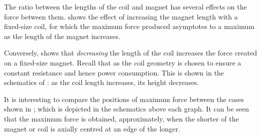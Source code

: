 The ratio between the lengths of the coil and magnet has several
effects on the force between them.  shows the
effect of increasing the magnet length with a fixed-size coil, for
which the maximum force produced asymptotes to a maximum as the
length of the magnet increases.

\begin{figure}
  \begin{subfigure}
  \end{subfigure}\par
  \begin{subfigure}
    \small{}
  \end{subfigure}
\end{figure}

Conversely,  shows that \emph{decreasing} the
length of the coil increases the force created on a fixed-size
magnet. Recall that as the coil geometry is chosen to ensure a constant
resistance and hence power consumption. This is shown in the schematics of
: as the coil length increases, its height decreases.

It is interesting to compare the positions of maximum force
between the cases shown in ;
which is depicted in the schematics above each graph.
It can be seen that the maximum force is obtained, approximately, when
the shorter of the magnet or coil is axially centred at an edge of the longer.

\begin{figure}
  \begin{subfigure}
  \end{subfigure}\par
  \begin{subfigure}
  \end{subfigure}
\end{figure}

